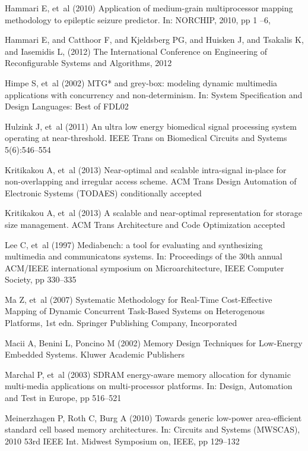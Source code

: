\documentclass[smallextended]{svjour3}
\begin{document}
\begin{thebibliography}{40}
Hammari E, et~al (2010) Application of medium-grain multiprocessor mapping
  methodology to epileptic seizure predictor. In: NORCHIP, 2010, pp 1 --6,
  
Hammari E, and Catthoor F, and Kjeldsberg PG, and Huisken J, and Tsakalis K, and Iasemidis L, (2012) The International Conference on Engineering of Reconfigurable Systems and Algorithms, 2012 

Himpe S, et~al (2002) {M}{T}{G}* and grey-box: modeling dynamic multimedia
  applications with concurrency and non-determinism. In: System Specification
  and Design Languages: Best of FDL02

Hulzink J, et~al (2011) An ultra low energy biomedical signal processing system
  operating at near-threshold. IEEE Trans on Biomedical Circuits and Systems
  5(6):546--554

Kritikakou A, et~al (2013{}) Near-optimal and scalable intra-signal
  in-place for non-overlapping and irregular access scheme. ACM Trans Design
  Automation of Electronic Systems (TODAES) conditionally accepted

Kritikakou A, et~al (2013{}) A scalable and near-optimal
  representation for storage size management. ACM Trans Architecture and Code
  Optimization accepted

Lee C, et~al (1997) Mediabench: a tool for evaluating and synthesizing
  multimedia and communicatons systems. In: Proceedings of the 30th annual
  ACM/IEEE international symposium on Microarchitecture, IEEE Computer Society,
  pp 330--335

Ma Z, et~al (2007) Systematic Methodology for Real-Time Cost-Effective Mapping
  of Dynamic Concurrent Task-Based Systems on Heterogenous Platforms, 1st edn.
  Springer Publishing Company, Incorporated

Macii A, Benini L, Poncino M (2002) Memory Design Techniques for Low-Energy
  Embedded Systems. Kluwer Academic Publishers

Marchal P, et~al (2003) {S}{D}{R}{A}{M} energy-aware memory allocation for
  dynamic multi-media applications on multi-processor platforms. In: Design,
  Automation and Test in Europe, pp 516--521

Meinerzhagen P, Roth C, Burg A (2010) Towards generic low-power area-efficient
  standard cell based memory architectures. In: Circuits and Systems (MWSCAS),
  2010 53rd IEEE Int. Midwest Symposium on, IEEE, pp 129--132


\end{thebibliography}
\end{document}
